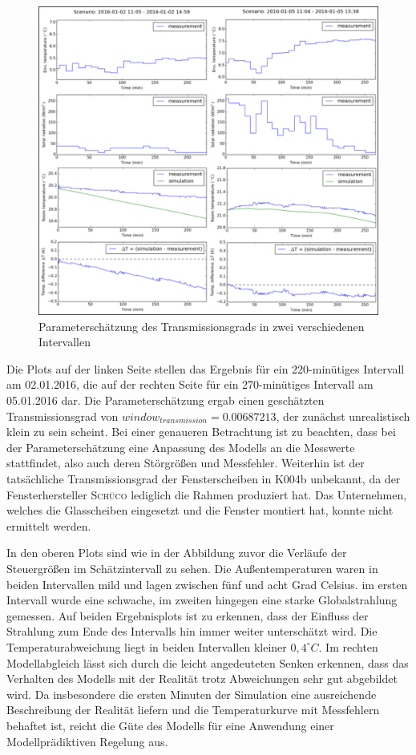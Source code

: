 \begin{figure}
\centering
\includegraphics[width=\textwidth]{abbildungen/20160329_pestep2}
\caption{Parameterschätzung des Transmissionsgrads in zwei verschiedenen Intervallen}
\label{fig:step2}
\end{figure}

Die Plots auf der linken Seite stellen das Ergebnis für ein 220-minütiges Intervall am 02.01.2016, die auf der rechten Seite für ein 270-minütiges Intervall am 05.01.2016 dar. Die Parameterschätzung ergab einen geschätzten Transmissionsgrad von $window_{transmission}=0.00687213$, der zunächst unrealistisch klein zu sein scheint. Bei einer genaueren Betrachtung ist zu beachten, dass bei der Parameterschätzung eine Anpassung des Modells an die Messwerte stattfindet, also auch deren Störgrößen und Messfehler. Weiterhin ist der tatsächliche Transmissionsgrad der Fensterscheiben in K004b unbekannt, da der Fensterhersteller \textsc{Schüco} lediglich die Rahmen produziert hat. Das Unternehmen, welches die Glasscheiben eingesetzt und die Fenster montiert hat, konnte nicht ermittelt werden. 

In den oberen Plots sind wie in der Abbildung zuvor die Verläufe der Steuergrößen im Schätzintervall zu sehen. Die Außentemperaturen waren in beiden Intervallen mild und lagen zwischen fünf und acht Grad Celsius. im ersten Intervall wurde eine schwache, im zweiten hingegen eine starke Globalstrahlung gemessen. Auf beiden Ergebnisplots ist zu erkennen, dass der Einfluss der Strahlung zum Ende des Intervalls hin immer weiter unterschätzt wird. Die Temperaturabweichung liegt in beiden Intervallen kleiner $0,4^{\circ}C$. Im rechten Modellabgleich lässt sich durch die leicht angedeuteten Senken erkennen, dass das Verhalten des Modells mit der Realität trotz Abweichungen sehr gut abgebildet wird.
Da insbesondere die ersten Minuten der Simulation eine ausreichende Beschreibung der Realität liefern und die Temperaturkurve mit Messfehlern behaftet ist, reicht die Güte des Modells für eine Anwendung einer Modellprädiktiven Regelung aus. 


